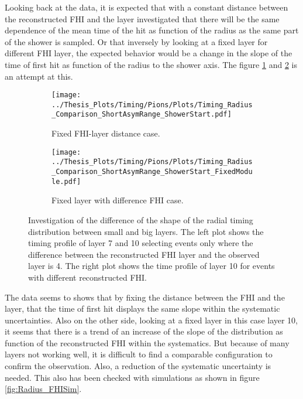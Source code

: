 Looking back at the data, it is expected that with a constant distance between the reconstructed FHI and the layer investigated that there will be the same dependence of the mean time of the hit as function of the radius as the same part of the shower is sampled. Or that inversely by looking at a fixed layer for different FHI layer, the expected behavior would be a change in the slope of the time of first hit as function of the radius to the shower axis. The figure \ref{fig:Radius_FHI} and \ref{fig:Radius_FHI_Fixed} is an attempt at this.

\begin{figure}[htbp!]
	\begin{subfigure}[t]{0.5\textwidth}
		\centering
		\texttt{[image: ../Thesis\_Plots/Timing/Pions/Plots/Timing\_Radius\_Comparison\_ShortAsymRange\_ShowerStart.pdf]}
		\caption{Fixed FHI-layer distance case.}\label{fig:Radius_FHI}
	\end{subfigure}
	\hfill
	\begin{subfigure}[t]{0.5\textwidth}
		\centering
		\texttt{[image: ../Thesis\_Plots/Timing/Pions/Plots/Timing\_Radius\_Comparison\_ShortAsymRange\_ShowerStart\_FixedModule.pdf]}
		\caption{Fixed layer with difference FHI case.}\label{fig:Radius_FHI_Fixed}
	\end{subfigure}
	\caption{Investigation of the difference of the shape of the radial timing distribution between small and big layers. The left plot shows the timing profile of layer 7 and 10 selecting events only where the difference between the reconstructed FHI layer and the observed layer is 4. The right plot shows the time profile of layer 10 for events with different reconstructed FHI.}
	\label{fig:Radius_FHIAll}
\end{figure}

The data seems to shows that by fixing the distance between the FHI and the layer, that the time of first hit displays the same slope within the systematic uncertainties. Also on the other side, looking at a fixed layer in this case layer 10, it seems that there is a trend of an increase of the slope of the distribution as function of the reconstructed FHI within the systematics. But because of many layers not working well, it is difficult to find a comparable configuration to confirm the observation. Also, a reduction of the systematic uncertainty is needed. This also has been checked with simulations as shown in figure \ref{fig:Radius_FHISim}.

